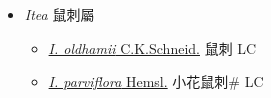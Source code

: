 
  \begin{itemize}
 \item[] \textit{Itea} 鼠刺屬
                    
  \begin{itemize}
        \item[] \href{http://www.theplantlist.org/tpl1.1/search?q=Itea+oldhamii}{\textit{I. oldhamii} C.K.Schneid.}   鼠刺 LC
        \item[] \href{http://www.theplantlist.org/tpl1.1/search?q=Itea+parviflora}{\textit{I. parviflora} Hemsl.}   小花鼠刺\# LC
  \end{itemize}
  \end{itemize}
